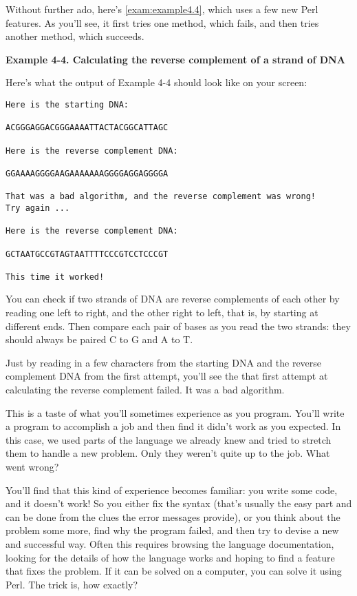 Without further ado, here's \autoref{exam:example4.4}, which uses a few new Perl features. As you'll see, it first tries one method, which fails, and then tries another method, which succeeds. 

\textbf{Example 4-4. Calculating the reverse complement of a strand of DNA}



Here's what the output of Example 4-4 should look like on your screen:

\begin{lstlisting}
Here is the starting DNA:

ACGGGAGGACGGGAAAATTACTACGGCATTAGC

Here is the reverse complement DNA:

GGAAAAGGGGAAGAAAAAAAGGGGAGGAGGGGA

That was a bad algorithm, and the reverse complement was wrong!
Try again ...

Here is the reverse complement DNA:

GCTAATGCCGTAGTAATTTTCCCGTCCTCCCGT

This time it worked!
\end{lstlisting}

You can check if two strands of DNA are reverse complements of each other by reading one left to right, and the other right to left, that is, by starting at different ends. Then compare each pair of bases as you read the two strands: they should always be paired C to G and A to T.

Just by reading in a few characters from the starting DNA and the reverse complement DNA from the first attempt, you'll see the that first attempt at calculating the reverse complement failed. It was a bad algorithm.

This is a taste of what you'll sometimes experience as you program. You'll write a program to accomplish a job and then find it didn't work as you expected. In this case, we used parts of the language we already knew and tried to stretch them to handle a new problem. Only they weren't quite up to the job. What went wrong?

You'll find that this kind of experience becomes familiar: you write some code, and it doesn't work! So you either fix the syntax (that's usually the easy part and can be done from the clues the error messages provide), or you think about the problem some more, find why the program failed, and then try to devise a new and successful way. Often this requires browsing the language documentation, looking for the details of how the language works and hoping to find a feature that fixes the problem. If it can be solved on a computer, you can solve it using Perl. The trick is, how exactly? 

